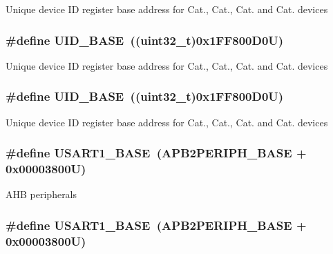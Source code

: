 Unique device I\-D register base address for Cat., Cat., Cat. and Cat. devices \hypertarget{group___peripheral__memory__map_ga664eda42b83c919b153b07b23348be67}{
\subsubsection[{U\-I\-D\-\_\-\-B\-A\-S\-E}]{\setlength{\rightskip}{0pt plus 5cm}\#define U\-I\-D\-\_\-\-B\-A\-S\-E~((uint32\-\_\-t)0x1\-F\-F800\-D0\-U)}}\label{group___peripheral__memory__map_ga664eda42b83c919b153b07b23348be67}
Unique device I\-D register base address for Cat., Cat., Cat. and Cat. devices \hypertarget{group___peripheral__memory__map_ga664eda42b83c919b153b07b23348be67}{
\subsubsection[{U\-I\-D\-\_\-\-B\-A\-S\-E}]{\setlength{\rightskip}{0pt plus 5cm}\#define U\-I\-D\-\_\-\-B\-A\-S\-E~((uint32\-\_\-t)0x1\-F\-F800\-D0\-U)}}\label{group___peripheral__memory__map_ga664eda42b83c919b153b07b23348be67}
Unique device I\-D register base address for Cat., Cat., Cat. and Cat. devices \hypertarget{group___peripheral__memory__map_ga86162ab3f740db9026c1320d46938b4d}{
\subsubsection[{U\-S\-A\-R\-T1\-\_\-\-B\-A\-S\-E}]{\setlength{\rightskip}{0pt plus 5cm}\#define U\-S\-A\-R\-T1\-\_\-\-B\-A\-S\-E~(A\-P\-B2\-P\-E\-R\-I\-P\-H\-\_\-\-B\-A\-S\-E + 0x00003800\-U)}}\label{group___peripheral__memory__map_ga86162ab3f740db9026c1320d46938b4d}
A\-H\-B peripherals \hypertarget{group___peripheral__memory__map_ga86162ab3f740db9026c1320d46938b4d}{
\subsubsection[{U\-S\-A\-R\-T1\-\_\-\-B\-A\-S\-E}]{\setlength{\rightskip}{0pt plus 5cm}\#define U\-S\-A\-R\-T1\-\_\-\-B\-A\-S\-E~(A\-P\-B2\-P\-E\-R\-I\-P\-H\-\_\-\-B\-A\-S\-E + 0x00003800\-U)}}\label{group___peripheral__memory__map_ga86162ab3f740db9026c1320d46938b4d}
